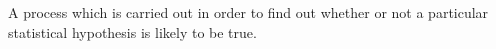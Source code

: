 A process which is carried out in order to find out whether or not a particular
statistical hypothesis is likely to be true.